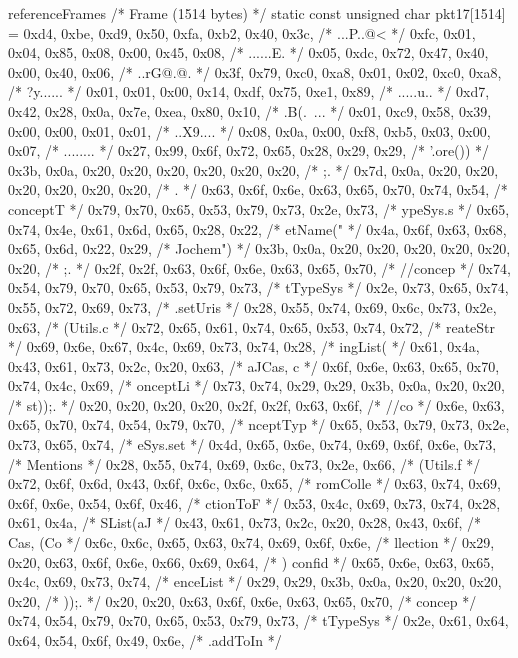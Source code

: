 \begin{chunk}{referenceFrames}
{{{{{/* Frame (1514 bytes) */
static const unsigned char pkt17[1514] = {
0xd4, 0xbe, 0xd9, 0x50, 0xfa, 0xb2, 0x40, 0x3c, /* ...P..@< */
0xfc, 0x01, 0x04, 0x85, 0x08, 0x00, 0x45, 0x08, /* ......E. */
0x05, 0xdc, 0x72, 0x47, 0x40, 0x00, 0x40, 0x06, /* ..rG@.@. */
0x3f, 0x79, 0xc0, 0xa8, 0x01, 0x02, 0xc0, 0xa8, /* ?y...... */
0x01, 0x01, 0x00, 0x14, 0xdf, 0x75, 0xe1, 0x89, /* .....u.. */
0xd7, 0x42, 0x28, 0x0a, 0x7e, 0xea, 0x80, 0x10, /* .B(.~... */
0x01, 0xc9, 0x58, 0x39, 0x00, 0x00, 0x01, 0x01, /* ..X9.... */
0x08, 0x0a, 0x00, 0xf8, 0xb5, 0x03, 0x00, 0x07, /* ........ */
0x27, 0x99, 0x6f, 0x72, 0x65, 0x28, 0x29, 0x29, /* '.ore()) */
0x3b, 0x0a, 0x20, 0x20, 0x20, 0x20, 0x20, 0x20, /* ;.       */
0x7d, 0x0a, 0x20, 0x20, 0x20, 0x20, 0x20, 0x20, /* }.       */
0x63, 0x6f, 0x6e, 0x63, 0x65, 0x70, 0x74, 0x54, /* conceptT */
0x79, 0x70, 0x65, 0x53, 0x79, 0x73, 0x2e, 0x73, /* ypeSys.s */
0x65, 0x74, 0x4e, 0x61, 0x6d, 0x65, 0x28, 0x22, /* etName(" */
0x4a, 0x6f, 0x63, 0x68, 0x65, 0x6d, 0x22, 0x29, /* Jochem") */
0x3b, 0x0a, 0x20, 0x20, 0x20, 0x20, 0x20, 0x20, /* ;.       */
0x2f, 0x2f, 0x63, 0x6f, 0x6e, 0x63, 0x65, 0x70, /* //concep */
0x74, 0x54, 0x79, 0x70, 0x65, 0x53, 0x79, 0x73, /* tTypeSys */
0x2e, 0x73, 0x65, 0x74, 0x55, 0x72, 0x69, 0x73, /* .setUris */
0x28, 0x55, 0x74, 0x69, 0x6c, 0x73, 0x2e, 0x63, /* (Utils.c */
0x72, 0x65, 0x61, 0x74, 0x65, 0x53, 0x74, 0x72, /* reateStr */
0x69, 0x6e, 0x67, 0x4c, 0x69, 0x73, 0x74, 0x28, /* ingList( */
0x61, 0x4a, 0x43, 0x61, 0x73, 0x2c, 0x20, 0x63, /* aJCas, c */
0x6f, 0x6e, 0x63, 0x65, 0x70, 0x74, 0x4c, 0x69, /* onceptLi */
0x73, 0x74, 0x29, 0x29, 0x3b, 0x0a, 0x20, 0x20, /* st));.   */
0x20, 0x20, 0x20, 0x20, 0x2f, 0x2f, 0x63, 0x6f, /*     //co */
0x6e, 0x63, 0x65, 0x70, 0x74, 0x54, 0x79, 0x70, /* nceptTyp */
0x65, 0x53, 0x79, 0x73, 0x2e, 0x73, 0x65, 0x74, /* eSys.set */
0x4d, 0x65, 0x6e, 0x74, 0x69, 0x6f, 0x6e, 0x73, /* Mentions */
0x28, 0x55, 0x74, 0x69, 0x6c, 0x73, 0x2e, 0x66, /* (Utils.f */
0x72, 0x6f, 0x6d, 0x43, 0x6f, 0x6c, 0x6c, 0x65, /* romColle */
0x63, 0x74, 0x69, 0x6f, 0x6e, 0x54, 0x6f, 0x46, /* ctionToF */
0x53, 0x4c, 0x69, 0x73, 0x74, 0x28, 0x61, 0x4a, /* SList(aJ */
0x43, 0x61, 0x73, 0x2c, 0x20, 0x28, 0x43, 0x6f, /* Cas, (Co */
0x6c, 0x6c, 0x65, 0x63, 0x74, 0x69, 0x6f, 0x6e, /* llection */
0x29, 0x20, 0x63, 0x6f, 0x6e, 0x66, 0x69, 0x64, /* ) confid */
0x65, 0x6e, 0x63, 0x65, 0x4c, 0x69, 0x73, 0x74, /* enceList */
0x29, 0x29, 0x3b, 0x0a, 0x20, 0x20, 0x20, 0x20, /* ));.     */
0x20, 0x20, 0x63, 0x6f, 0x6e, 0x63, 0x65, 0x70, /*   concep */
0x74, 0x54, 0x79, 0x70, 0x65, 0x53, 0x79, 0x73, /* tTypeSys */
0x2e, 0x61, 0x64, 0x64, 0x54, 0x6f, 0x49, 0x6e, /* .addToIn */
}}}}}
\end{chunk}
